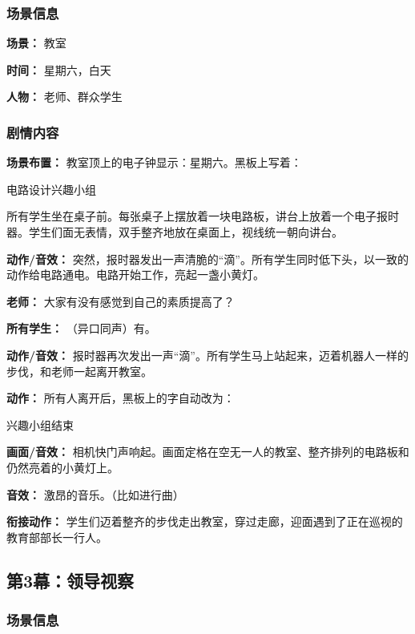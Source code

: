 \documentclass[11pt, a4paper]{article}
\begin{document}
	\subsubsection{场景信息}
	
	\textbf{场景：} 教室
	
	\textbf{时间：} 星期六，白天
	
	\textbf{人物：} 老师、群众学生
	
	\subsubsection{剧情内容}
	
	\textbf{场景布置：}
	教室顶上的电子钟显示：星期六。黑板上写着：
	
	\begin{center}
		\Large 电路设计兴趣小组
	\end{center}
	
	所有学生坐在桌子前。每张桌子上摆放着一块电路板，讲台上放着一个电子报时器。学生们面无表情，双手整齐地放在桌面上，视线统一朝向讲台。
	
	\textbf{动作/音效：}
	突然，报时器发出一声清脆的“滴”。所有学生同时低下头，以一致的动作给电路通电。电路开始工作，亮起一盏小黄灯。
	
	\textbf{老师：}
	大家有没有感觉到自己的素质提高了？
	
	\textbf{所有学生：}
	（异口同声）有。
	
	\textbf{动作/音效：}
	报时器再次发出一声“滴”。所有学生马上站起来，迈着机器人一样的步伐，和老师一起离开教室。
	
	\textbf{动作：}
	所有人离开后，黑板上的字自动改为：
	
	\begin{center}
		\Large 兴趣小组结束
	\end{center}
	
	\textbf{画面/音效：}
	相机快门声响起。画面定格在空无一人的教室、整齐排列的电路板和仍然亮着的小黄灯上。
	
	\textbf{音效：}
	激昂的音乐。（比如进行曲）
	
	\textbf{衔接动作：}
	学生们迈着整齐的步伐走出教室，穿过走廊，迎面遇到了正在巡视的教育部部长一行人。
	
	\newpage
	
	\subsection{第3幕：领导视察}
	
	\subsubsection{场景信息}
	
\end{document}
